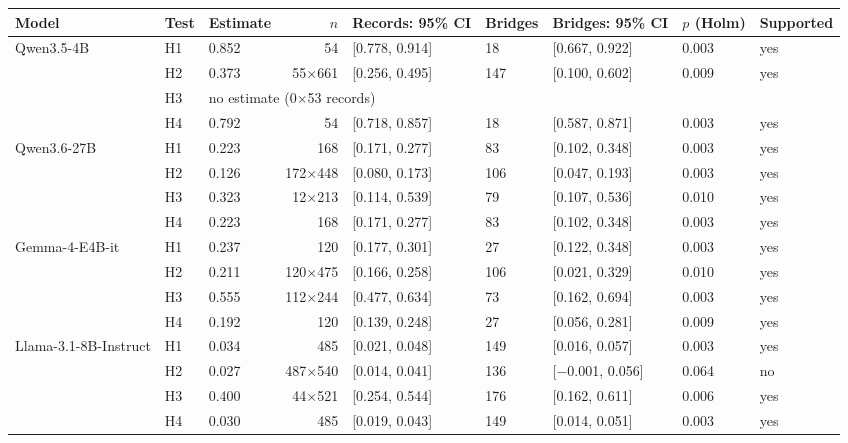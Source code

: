 \begin{tabular}{lllrlllll}
\toprule
Model & Test & Estimate & $n$ & Records: 95\% CI & Bridges & Bridges: 95\% CI & $p$ (Holm) & Supported \\
\midrule
Qwen3.5-4B & H1 & 0.852 & 54 & [0.778, 0.914] & 18 & [0.667, 0.922] & 0.003 & yes \\
 & H2 & 0.373 & 55$\times$661 & [0.256, 0.495] & 147 & [0.100, 0.602] & 0.009 & yes \\
 & H3 & \multicolumn{7}{l}{no estimate (0$\times$53 records)} \\
 & H4 & 0.792 & 54 & [0.718, 0.857] & 18 & [0.587, 0.871] & 0.003 & yes \\
\midrule
Qwen3.6-27B & H1 & 0.223 & 168 & [0.171, 0.277] & 83 & [0.102, 0.348] & 0.003 & yes \\
 & H2 & 0.126 & 172$\times$448 & [0.080, 0.173] & 106 & [0.047, 0.193] & 0.003 & yes \\
 & H3 & 0.323 & 12$\times$213 & [0.114, 0.539] & 79 & [0.107, 0.536] & 0.010 & yes \\
 & H4 & 0.223 & 168 & [0.171, 0.277] & 83 & [0.102, 0.348] & 0.003 & yes \\
\midrule
Gemma-4-E4B-it & H1 & 0.237 & 120 & [0.177, 0.301] & 27 & [0.122, 0.348] & 0.003 & yes \\
 & H2 & 0.211 & 120$\times$475 & [0.166, 0.258] & 106 & [0.021, 0.329] & 0.010 & yes \\
 & H3 & 0.555 & 112$\times$244 & [0.477, 0.634] & 73 & [0.162, 0.694] & 0.003 & yes \\
 & H4 & 0.192 & 120 & [0.139, 0.248] & 27 & [0.056, 0.281] & 0.009 & yes \\
\midrule
Llama-3.1-8B-Instruct & H1 & 0.034 & 485 & [0.021, 0.048] & 149 & [0.016, 0.057] & 0.003 & yes \\
 & H2 & 0.027 & 487$\times$540 & [0.014, 0.041] & 136 & [$-$0.001, 0.056] & 0.064 & no \\
 & H3 & 0.400 & 44$\times$521 & [0.254, 0.544] & 176 & [0.162, 0.611] & 0.006 & yes \\
 & H4 & 0.030 & 485 & [0.019, 0.043] & 149 & [0.014, 0.051] & 0.003 & yes \\
\bottomrule
\end{tabular}
